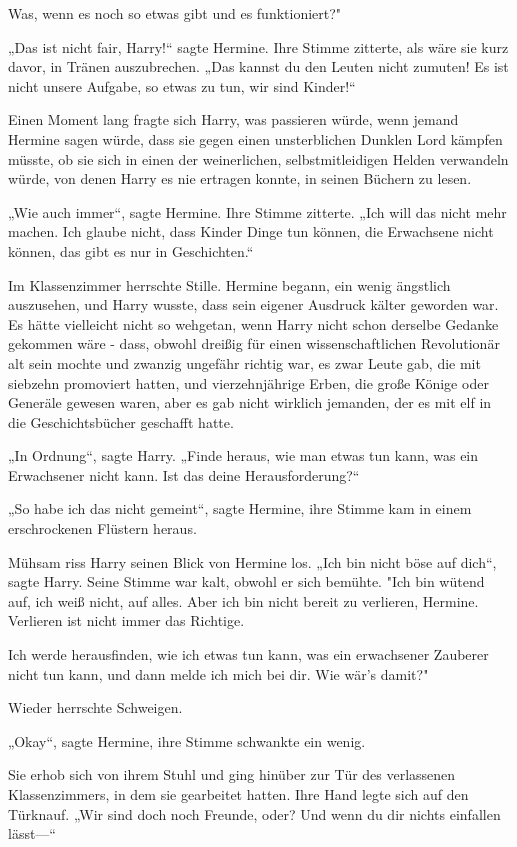 {Was, wenn es noch so etwas gibt und es funktioniert?"

„Das ist nicht fair, Harry!“ sagte Hermine. Ihre Stimme zitterte, als wäre sie kurz davor, in Tränen auszubrechen. „Das kannst du den Leuten nicht zumuten! Es ist nicht unsere Aufgabe, so etwas zu tun, wir sind Kinder!“

Einen Moment lang fragte sich Harry, was passieren würde, wenn jemand Hermine sagen würde, dass sie gegen einen unsterblichen Dunklen Lord kämpfen müsste, ob sie sich in einen der weinerlichen, selbstmitleidigen Helden verwandeln würde, von denen Harry es nie ertragen konnte, in seinen Büchern zu lesen.

„Wie auch immer“, sagte Hermine. Ihre Stimme zitterte. „Ich will das nicht mehr machen. Ich glaube nicht, dass Kinder Dinge tun können, die Erwachsene nicht können, das gibt es nur in Geschichten.“

Im Klassenzimmer herrschte Stille. Hermine begann, ein wenig ängstlich auszusehen, und Harry wusste, dass sein eigener Ausdruck kälter geworden war. Es hätte vielleicht nicht so wehgetan, wenn Harry nicht schon derselbe Gedanke gekommen wäre - dass, obwohl dreißig für einen wissenschaftlichen Revolutionär alt sein mochte und zwanzig ungefähr richtig war, es zwar Leute gab, die mit siebzehn promoviert hatten, und vierzehnjährige Erben, die große Könige oder Generäle gewesen waren, aber es gab nicht wirklich jemanden, der es mit elf in die Geschichtsbücher geschafft hatte.

„In Ordnung“, sagte Harry. „Finde heraus, wie man etwas tun kann, was ein Erwachsener nicht kann. Ist das deine Herausforderung?“

„So habe ich das nicht gemeint“, sagte Hermine, ihre Stimme kam in einem erschrockenen Flüstern heraus.

Mühsam riss Harry seinen Blick von Hermine los. „Ich bin nicht böse auf dich“, sagte Harry. Seine Stimme war kalt, obwohl er sich bemühte. "Ich bin wütend auf, ich weiß nicht, auf alles. Aber ich bin nicht bereit zu verlieren, Hermine. Verlieren ist nicht immer das Richtige.

Ich werde herausfinden, wie ich etwas tun kann, was ein erwachsener Zauberer nicht tun kann, und dann melde ich mich bei dir. Wie wär's damit?"

Wieder herrschte Schweigen.

„Okay“, sagte Hermine, ihre Stimme schwankte ein wenig.

Sie erhob sich von ihrem Stuhl und ging hinüber zur Tür des verlassenen Klassenzimmers, in dem sie gearbeitet hatten. Ihre Hand legte sich auf den Türknauf. „Wir sind doch noch Freunde, oder? Und wenn du dir nichts einfallen lässt—“

}
